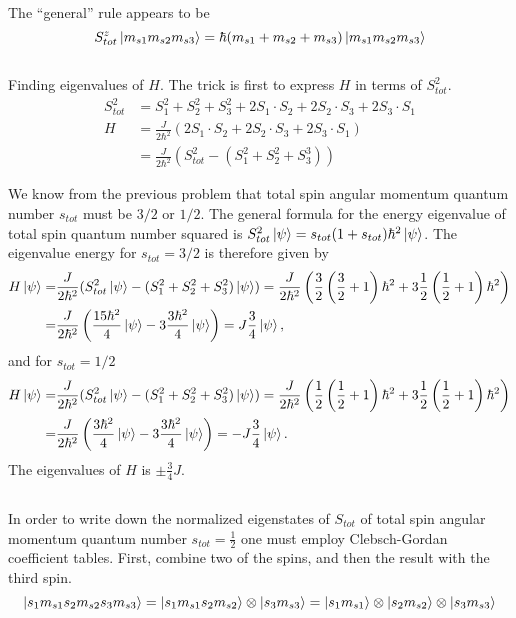 \documentclass{article}
\begin{document}
The ``general'' rule appears to be
\begin{equation}
S^z_{tot}\ket{m_{s1}m_{s2}m_{s3}}=\hbar (m_{s1}+m_{s2}+m_{s3})\ket{m_{s1}m_{s2}m_{s3}}
\end{equation}


\subsection{}
Finding eigenvalues of $H$. The trick is first to express $H$ in terms of $S_{tot}^2$.
\begin{align*}
S_{tot}^2 &= S_1^2 + S_2^2 + S_3^2 + 2S_1\cdot S_2 + 2S_2\cdot S_3 + 2S_3\cdot S_1 \\
H &= \frac{J}{2\hbar^2}(2S_1\cdot S_2 + 2S_2\cdot S_3 + 2S_3\cdot S_1) \\
  &= \frac{J}{2\hbar^2}(S_{tot}^2-(S_1^2+S_2^2+S_3^3))
\end{align*}

We know from the previous problem that total spin angular momentum quantum number $s_{tot}$ must be $3/2$ or $1/2$. The general formula for the energy eigenvalue of total spin quantum number squared is $S^2_{tot}\ket{\psi}=s_{tot}(1+s_{tot})\hbar^2\ket{\psi}$. The eigenvalue energy for $s_{tot}=3/2$ is therefore given by
\begin{align*}
H\ket{\psi} =& \frac{J}{2\hbar^2}(S_{tot}^2\ket{\psi}-(S_1^2+S_2^2+S_3^2)\ket{\psi})=\frac{J}{2\hbar^2}\left(\frac{3}{2}\left(\frac{3}{2}+1\right)\hbar^2 +3\frac{1}{2}\left(\frac{1}{2}+1\right)\hbar^2\right)\\
=&\frac{J}{2\hbar^2}\left(\frac{15\hbar^2}{4}\ket{\psi} -3\frac{3\hbar^2}{4}\ket{\psi} \right) = J\frac{3}{4}\ket{\psi},
\end{align*}
and for $s_{tot}=1/2$
\begin{align*}
H\ket{\psi} =& \frac{J}{2\hbar^2}(S_{tot}^2\ket{\psi}-(S_1^2+S_2^2+S_3^2)\ket{\psi})=\frac{J}{2\hbar^2}\left(\frac{1}{2}\left(\frac{1}{2}+1\right)\hbar^2 +3\frac{1}{2}\left(\frac{1}{2}+1\right)\hbar^2\right)\\
=&\frac{J}{2\hbar^2}\left(\frac{3\hbar^2}{4}\ket{\psi} -3\frac{3\hbar^2}{4}\ket{\psi} \right) = -J\frac{3}{4}\ket{\psi}.
\end{align*}
The eigenvalues of $H$ is $\pm\frac{3}{4}J$.

\subsection{}
In order to write down the normalized eigenstates of $S_{tot}$ of total spin angular momentum quantum number $s_{tot}=\frac{1}{2}$ one must employ Clebsch-Gordan coefficient tables. First, combine two of the spins, and then the result with the third spin.
\begin{equation*}
\ket{s_1m_{s1}s_2m_{s2}s_3m_{s3}}=\ket{s_1m_{s1}s_2m_{s2}}\otimes\ket{s_3m_{s3}}=\ket{s_1m_{s1}}\otimes\ket{s_2m_{s2}}\otimes\ket{s_3m_{s3}}
\end{equation*}
\end{document}
